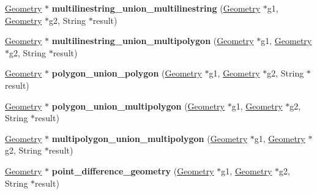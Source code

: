 \begin{DoxyCompactItemize}
\item 
\mbox{\label{classBG__setop__wrapper_a376ea9b6c3cd2a92d646d9c21b476a88}} 
\mbox{\hyperlink{classGeometry}{Geometry}} $\ast$ {\bfseries multilinestring\+\_\+union\+\_\+multilinestring} (\mbox{\hyperlink{classGeometry}{Geometry}} $\ast$g1, \mbox{\hyperlink{classGeometry}{Geometry}} $\ast$g2, String $\ast$result)
\item 
\mbox{\label{classBG__setop__wrapper_a5af42ba59d41bd106ac42641c1f1be2e}} 
\mbox{\hyperlink{classGeometry}{Geometry}} $\ast$ {\bfseries multilinestring\+\_\+union\+\_\+multipolygon} (\mbox{\hyperlink{classGeometry}{Geometry}} $\ast$g1, \mbox{\hyperlink{classGeometry}{Geometry}} $\ast$g2, String $\ast$result)
\item 
\mbox{\label{classBG__setop__wrapper_a3485f87e9b3ea942dfbd13c39b026c0a}} 
\mbox{\hyperlink{classGeometry}{Geometry}} $\ast$ {\bfseries polygon\+\_\+union\+\_\+polygon} (\mbox{\hyperlink{classGeometry}{Geometry}} $\ast$g1, \mbox{\hyperlink{classGeometry}{Geometry}} $\ast$g2, String $\ast$result)
\item 
\mbox{\label{classBG__setop__wrapper_afb1c5a5bf9d37367c312e9f4ebdfe2f2}} 
\mbox{\hyperlink{classGeometry}{Geometry}} $\ast$ {\bfseries polygon\+\_\+union\+\_\+multipolygon} (\mbox{\hyperlink{classGeometry}{Geometry}} $\ast$g1, \mbox{\hyperlink{classGeometry}{Geometry}} $\ast$g2, String $\ast$result)
\item 
\mbox{\label{classBG__setop__wrapper_a60a95c3039b6f8c6e75bc1631cd06594}} 
\mbox{\hyperlink{classGeometry}{Geometry}} $\ast$ {\bfseries multipolygon\+\_\+union\+\_\+multipolygon} (\mbox{\hyperlink{classGeometry}{Geometry}} $\ast$g1, \mbox{\hyperlink{classGeometry}{Geometry}} $\ast$g2, String $\ast$result)
\item 
\mbox{\label{classBG__setop__wrapper_a311130fe14d629b7c0a899ec76675953}} 
\mbox{\hyperlink{classGeometry}{Geometry}} $\ast$ {\bfseries point\+\_\+difference\+\_\+geometry} (\mbox{\hyperlink{classGeometry}{Geometry}} $\ast$g1, \mbox{\hyperlink{classGeometry}{Geometry}} $\ast$g2, String $\ast$result)
\item 
\mbox{\label{classBG__setop__wrapper_af97e866557b566b9826d92a2381fb372}} 

\end{DoxyCompactItemize}
